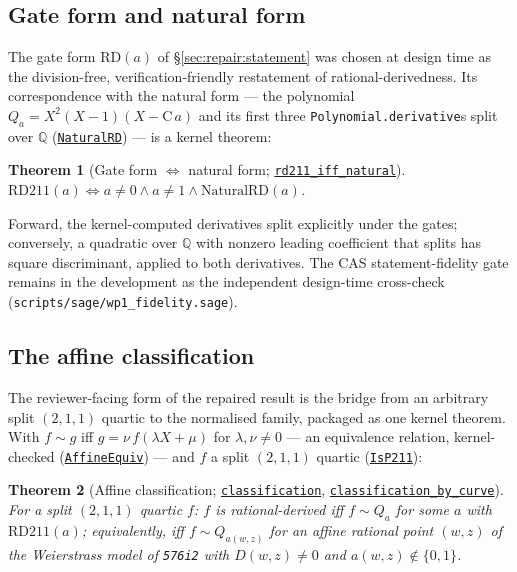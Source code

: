 \documentclass[11pt]{amsart}
\newtheorem{theorem}{Theorem}[section]
\newcommand{\Q}{\mathbb{Q}}
\newcommand{\repourl}{https://github.com/hirokifukui/rd-quartics-classification}
\newcommand{\repotag}{v1.1.0}
\newcommand{\leanline}[3]{\href{\repourl/blob/\repotag/#1\#L#2}{\texttt{#3}}}
\begin{document}
\subsection{Gate form and natural form}\label{sec:fidelity:gate}

The gate form $\mathrm{RD}(a)$ of \S\ref{sec:repair:statement} was
chosen at design time as the division-free, verification-friendly
restatement of rational-derivedness.  Its correspondence with the
natural form --- the polynomial $Q_a = X^{2}(X-1)(X-\mathrm{C}\,a)$ and
its first three \texttt{Polynomial.derivative}s split over $\Q$
(\leanline{Thm7Prime/Fidelity.lean}{27}{NaturalRD}) --- is a kernel
theorem:

\begin{theorem}[Gate form $\iff$ natural form;
\leanline{Thm7Prime/Fidelity.lean}{173}{rd211\_iff\_natural}]
\label{thm:fidelity}
$\mathrm{RD211}(a) \iff a\neq 0 \wedge a\neq 1 \wedge
\mathrm{NaturalRD}(a)$.
\end{theorem}

Forward, the kernel-computed derivatives split explicitly under the
gates; conversely, a quadratic over $\Q$ with nonzero leading
coefficient that splits has square discriminant, applied to both
derivatives.  The CAS statement-fidelity gate remains in the
development as the independent design-time cross-check
(\texttt{scripts/sage/wp1\_fidelity.sage}).

\subsection{The affine classification}\label{sec:fidelity:affine}

The reviewer-facing form of the repaired result is the bridge from an
arbitrary split $(2,1,1)$ quartic to the normalised family, packaged as
one kernel theorem.  With $f\sim g$ iff $g=\nu\,f(\lambda X+\mu)$ for
$\lambda,\nu\neq 0$ --- an equivalence relation, kernel-checked
(\leanline{Thm7Prime/Classification.lean}{30}{AffineEquiv}) --- and
$f$ a split $(2,1,1)$ quartic
(\leanline{Thm7Prime/Classification.lean}{35}{IsP211}):

\begin{theorem}[Affine classification;
\leanline{Thm7Prime/Classification.lean}{175}{classification},
\leanline{Thm7Prime/Classification.lean}{188}{classification\_by\_curve}]
\label{thm:classification}
For a split $(2,1,1)$ quartic $f$: $f$ is rational-derived iff
$f\sim Q_{a}$ for some $a$ with
$\mathrm{RD211}(a)$; equivalently, iff $f\sim Q_{a(w,z)}$ for an affine
rational point $(w,z)$ of the Weierstrass model of \texttt{576i2} with
$D(w,z)\neq0$ and $a(w,z)\notin\{0,1\}$.
\end{theorem}
\end{document}
